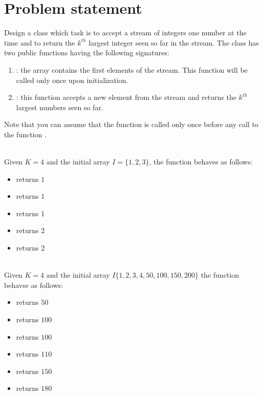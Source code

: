 \section{Problem statement}
\begin{exercise}
	Design a class which task is to accept a stream of integers one number at the time and to return the
	$k^{th}$ largest integer seen so far in the stream. The class has two public functions having
	the following signatures:
	\begin{enumerate}
		\item {}: the array
		 contains the first elements of the stream. This function will be called only once
		upon initialization.
		\item  {}: this function accepts a new element from the stream and
		returns the $k^{th}$ largest numbers seen so far. 
	\end{enumerate}
Note that you can assume that the function  is called only once before any call to the function .

\begin{example}
	\hfill \\
	Given $K=4$ and the initial array $I=\{1,2,3\}$, the function  behaves as
	follows:
	\begin{itemize}
		\item {} returns $1$
		\item {} returns $1$
		\item {} returns $1$
		\item {} returns $2$
		\item {} returns $2$
	\end{itemize}
\end{example}

\begin{example}
	\hfill \\
	Given $K=4$ and the initial array $I\{1,2,3,4,50,100,150,200\}$ the function  behavse as follows:
	\begin{itemize}
		\item {} returns $50$
		\item {} returns $100$
		\item {} returns $100$
		\item {} returns $110$
		\item {} returns $150$
		\item {} returns $180$
	\end{itemize} 
	\label{ex:kthlargest_in_stream:example2} 
\end{example}

\end{exercise}

